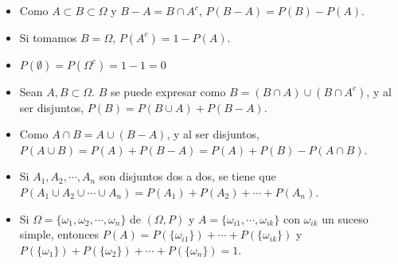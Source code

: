 \documentclass[a4paper, 11pt]{extarticle}
\begin{document}
\begin{multicols*}{2}
\begin{itemize}
\item Como \(A \subset B \subset \Omega\) y \(B - A = B \cap A^c\), \(P(B-A) =
  P(B) - P(A)\).
\item Si tomamos \(B = \Omega\), \(P(A^c) = 1 - P(A)\).
\item \(P(\emptyset) = P(\Omega^c) = 1 - 1 = 0\)
\item Sean \(A, B \subset \Omega\). \(B\) se puede expresar como \(B = (B \cap
  A) \cup (B \cap A^c)\), y al ser disjuntos, \(P(B) = P(B \cup A) + P(B - A)\).
\item Como \(A \cap B = A \cup (B - A)\), y al ser disjuntos, \(P(A \cup B) =
  P(A) + P(B-A) = P(A) + P(B) - P(A \cap B)\).
\item Si \(A_1, A_2, \cdots, A_n\) son disjuntos dos a dos, se tiene que \(P(A_1
  \cup A_2 \cup \cdots \cup A_n) = P(A_1) + P(A_2) + \cdots + P(A_n)\).
\item Si \(\Omega = \{ \omega_1,\omega_2, \cdots, \omega_n \}\) de \((\Omega, P)\) y \(A = \{ \omega_{i1}, \cdots, \omega_{ik} \}\) con \(\omega_{ik}\) un
suceso simple, entonces \(P(A) = P(\{ \omega_{i1} \}) + \cdots + P(\{ \omega_{ik}
  \})\) y \(P(\{ \omega_1 \}) + P(\{ \omega_2 \}) + \cdots + P(\{ \omega_n
  \}) = 1\).
\end{itemize}

\end{multicols*}
\pagebreak
\end{document}
